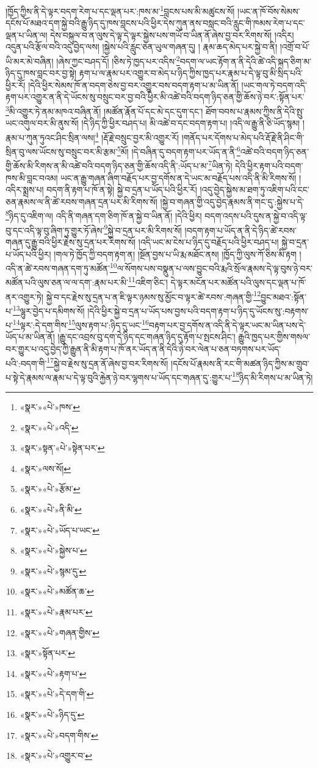།ཁྱོད་ཀྱིས་ནི་དེ་ལྟར་བདག་རེག་པ་དང་ལྡན་པར་:ཁས་མ་\footnote{«སྣར་»«པེ་»ཁས་}བླངས་པས་མི་མཚུངས་སོ། །ཡང་ན་ཁོ་བོས་སེམས་དངོས་པོ་མཐའ་དག་སྐྱེ་བའི་རྒྱུ་ཉིད་དུ་ཁས་བླངས་པའི་ཕྱིར་དེས་ཀུན་ནས་བསླང་བའི་རླུང་གི་ཁམས་རེག་པ་དང་ལྡན་པ་ཡིན་ལ། དེས་བསྐུལ་བ་ན་ལུས་དེ་ལྟ་དེ་ལྟར་སྐྱེས་པས་གཡོ་བ་ཡིན་ནོ་ཞེས་བྱ་བར་རིགས་སོ། །འདིར། འདུན་པའི་རྩོལ་བའི་འདུ་བྱེད་ལས། །སྐྱེས་པའི་རླུང་ཅན་ཡུལ་གཞན་དུ། །
རྣམ་ཆད་མེད་པར་སྐྱེ་བ་ནི། །འགྲོ་བ་པོ་ཡི་མར་མེ་བཞིན། །ཞེས་ཀྱང་བཤད་དོ། །ཅིས་ཏེ་ཁྱད་པར་འདིས་\footnote{«སྣར་»«པེ་»འདི་}བདག་ལ་ཡང་རྟོག་ན་ནི་དེའི་ཚེ་འདི་སྐད་ཅིག་མ་ཉིད་དུ་ཁས་བླང་བར་བྱ་སྟེ། རྟག་པ་ལ་རྣམ་པར་འགྱུར་བ་མེད་པ་ཉིད་ཀྱིས་ཁྱད་པར་རྣམ་པ་དེ་ལྟ་བུ་མི་སྲིད་པའི་ཕྱིར་རོ། །དེའི་ཕྱིར་སེམས་ཁོ་ན་བདག་ཅེས་བྱ་བར་འགྱུར་བས་བདག་རྟག་པ་མ་ཡིན་ནོ། །ཡང་གལ་ཏེ་བདག་འདི་རྟག་པར་འགྱུར་ན་ནི་དེ་ཡོངས་སུ་བསྲུང་བར་བྱ་བའི་ཕྱིར་མི་འཚེ་བའི་བདག་ཉིད་ཅན་གྱི་ཆོས་ཉེ་བར་:སྟོན་པར་\footnote{«སྣར་»སྟན་«པེ་»སྟེན་པར་}མི་འགྱུར་ཏེ་ནམ་མཁའ་བཞིན་ནོ། །མཚོན་རྣོན་པོ་དང་མེ་དང་དུག་དང་། ཐོག་བབས་པ་རྣམས་ཀྱིས་ནི་དེའི་སྤུ་ཡང་འགུལ་བར་མི་ནུས་སོ། །དེ་ཉིད་ཀྱི་ཕྱིར་བཤད་པ། མི་འཚེ་བ་དང་བདག་རྟག་པ། །འདི་ལ་རྒྱུ་ནི་ཅི་ཡོད་སྙམ། །རྣམ་པ་ཀུན་ཏུའང་ཤིང་སྲིན་ལས།\footnote{«སྣར་»ལས་སོ།} །རྡོ་རྗེ་བསྲུང་བྱར་མི་འགྱུར་རོ། །གནོད་པར་དོགས་པ་མེད་པའི་རྡོ་རྗེ་ནི་ཤིང་གི་སྲིན་བུ་ལས་ཡོངས་སུ་བསྲུང་བར་མི་རྩམ་\footnote{«སྣར་»«པེ་»རྩོམ་}མོ། །དེ་བཞིན་དུ་བདག་རྟག་པར་ཡོད་ན་ནི་\footnote{«སྣར་»«པེ་»ནི་མི་}འཚེ་བའི་བདག་ཉིད་ཅན་གྱི་ཆོས་མི་རིགས་ན་མི་འཚེ་བའི་བདག་ཉིད་ཅན་གྱི་ཆོས་འདི་ནི་:ཡོད་པ་མ་\footnote{«སྣར་»«པེ་»ཡོད་པ་ཡང་}ཡིན་ཏེ། དེའི་ཕྱིར་རྟག་པའི་བདག་ཁས་མི་བླང་བའམ། ཡང་ན་རྒྱུ་གཞན་ཞིག་བརྗོད་པར་བྱ་དགོས་ན་དེ་ཡང་མ་བརྗོད་པས་འདི་ནི་མི་རིགས་སོ། །འདིར་སྨྲས་པ། བདག་ནི་རྟག་པ་ཁོ་ན་སྟེ། སྐྱེ་བ་དྲན་པ་ཡོད་པའི་ཕྱིར་རོ། །འདུ་བྱེད་སྐྱེས་མ་ཐག་ཏུ་འཇིག་པའི་ངང་ཅན་རྣམས་ལ་ནི་ཚེ་རབས་གཞན་དྲན་པར་མི་རིགས་སོ། །སྐྱེ་བ་གཞན་གྱི་འདུ་བྱེད་རྣམས་ནི་གང་དུ་:སྐྱེས་པ་དེ་\footnote{«སྣར་»«པེ་»སྐྱེས་པ་}ཉིད་དུ་འཇིག་ལ། འདི་ནི་གཞན་དག་ཅིག་ཁོ་ན་སྐྱེ་བ་ཡིན་ནོ། །དེའི་ཕྱིར། བདག་འདས་པའི་དུས་ན་སྐྱེ་བ་འདི་ལྟ་བུ་དང་འདི་ལྟ་བུ་ཞིག་ཏུ་གྱུར་ཏོ་ཞེས་\footnote{«སྣར་»«པེ་»སྙམ་དུ་}སྐྱེ་བ་དྲན་པར་མི་རིགས་སོ། །བདག་རྟག་པ་ཡོད་ན་ནི་དེ་ཉིད་ཚེ་རབས་གཞན་དུ་རྒྱུ་བའི་ཕྱིར་རྗེས་སུ་དྲན་པར་རིགས་སོ། །འདི་ཡང་མ་ངེས་པ་ཉིད་དུ་བརྗོད་པའི་ཕྱིར་བཤད་པ། སྐྱེ་བ་དྲན་པ་ཡོད་པའི་ཕྱིར། །གལ་ཏེ་ཁྱོད་ཀྱི་བདག་རྟག་ན། །སྔོན་བྱས་པ་ཡི་རྨ་མཐོང་ནས། །ཁྱོད་ཀྱི་ལུས་ཀོ་ཅིས་མི་རྟག །འདི་ན་ཚེ་རབས་གཞན་དག་ཏུ་མཚོན་\footnote{«སྣར་»«པེ་»མཚོན་ཆ་}ལ་སོགས་པས་བསྣུན་པ་ལས་བྱུང་བའི་རྨའི་སྲོལ་རྣམས་དེ་ལྟ་བུས་ཉེ་བར་མཚོན་པའི་ལུས་ཅན་ལ་ལ་དག་:རྣམ་པར་མི་\footnote{«སྣར་»«པེ་»རྣམ་པར་}འཇིག་ཅིང་། དེ་ལྟར་མངོན་པར་མཚོན་པའི་ལུས་དང་ལྡན་པ་ཁོ་ནར་འགྱུར་ཏེ། སྐྱེ་བ་དང་རྗེས་སུ་དྲན་པ་ན་ཇི་ལྟར་ཉམས་སུ་མྱོང་བ་ལྟར་ཚེ་རབས་:གཞན་གྱི་\footnote{«སྣར་»«པེ་»གཞན་གྱིས་}བྱུང་མཐའ་:སྟོན་པ་\footnote{«སྣར་»སྟོན་པར་}ལྷུར་བྱེད་པ་དམིགས་སོ། །དེའི་ཕྱིར་སྐྱེ་བ་དྲན་པ་ཡོད་པས་བྱས་པའི་བདག་རྟག་པ་ཉིད་དུ་ཡོངས་སུ་:བརྟགས་པ་\footnote{«སྣར་»«པེ་»རྟག་པ་}ལྟར་:དེ་དག་གིས་\footnote{«སྣར་»«པེ་»དེ་དག་གི་}ལུས་རྟག་པ་:ཉིད་དུ་ཡང་\footnote{«སྣར་»«པེ་»ཉིད་དུ་}བརྟག་པར་བྱ་དགོས་ན་འདི་ནི་དེ་ལྟར་ཡང་མ་ཡིན་པས་དེ་ཡོད་པ་མ་ཡིན་ནོ། །རྒྱུ་དང་འབྲས་བུ་དག་དེ་ཉིད་དང་གཞན་ཉིད་དུ་རྟོག་པ་སྤངས་ཤིང་། རྒྱུའི་ཁྱད་པར་གྱིས་གསལ་བར་གྱུར་པ་འདུ་བྱེད་ཀྱི་རྒྱུན་ནི་མི་རྟག་པ་ཁོ་ནར་ཡོད་ན་ནི་དེའི་ཉེ་བར་ལེན་པ་ཅན་བཏགས་པར་ཡོད་པའི་:བདག་གི་\footnote{«སྣར་»«པེ་»བདག་གིས་}སྐྱེ་བ་རྗེས་སུ་དྲན་ནོ་ཞེས་བྱ་བར་རིགས་སོ། །དངོས་པོ་རྣམས་ནི་རང་གི་མཚན་ཉིད་ཀྱིས་མ་གྲུབ་པ་སྟེ་དེ་རྣམས་ལ་རྣམ་པ་དེ་ལྟ་བུའི་རྐྱེན་ཉེ་བར་ལྷགས་པ་ཡོད་དང་གཞན་དུ་:གྱུར་པ་\footnote{«སྣར་»«པེ་»འགྱུར་བ་}ཉིད་མི་རིགས་པ་མ་ཡིན་ཏེ། 